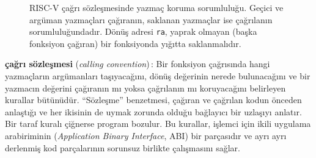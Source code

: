 \begin{figure}[htbp]
\centering
{}
\caption[Çağrı sözleşmesinde yazmaç koruma sorumluluğu]{RISC-V çağrı sözleşmesinde yazmaç koruma sorumluluğu. Geçici ve argüman yazmaçları çağıranın, saklanan yazmaçlar ise çağrılanın sorumluluğundadır. Dönüş adresi \texttt{ra}, yaprak olmayan (başka fonksiyon çağıran) bir fonksiyonda yığıtta saklanmalıdır.}
\label{fig:yazmac-koruma}
\end{figure}

\begin{terimnotu}
\textbf{çağrı sözleşmesi} (\emph{calling convention})\,: Bir fonksiyon çağrısında hangi yazmaçların argümanları taşıyacağını, dönüş değerinin nerede bulunacağını ve bir yazmacın değerini çağıranın mı yoksa çağrılanın mı koruyacağını belirleyen kurallar bütünüdür. ``Sözleşme'' benzetmesi, çağıran ve çağrılan kodun önceden anlaştığı ve her ikisinin de uymak zorunda olduğu bağlayıcı bir uzlaşıyı anlatır. Bir taraf kuralı çiğnerse program bozulur. Bu kurallar, işlemci için ikili uygulama arabiriminin (\emph{Application Binary Interface}, ABI) bir parçasıdır ve ayrı ayrı derlenmiş kod parçalarının sorunsuz birlikte çalışmasını sağlar.
\end{terimnotu}

